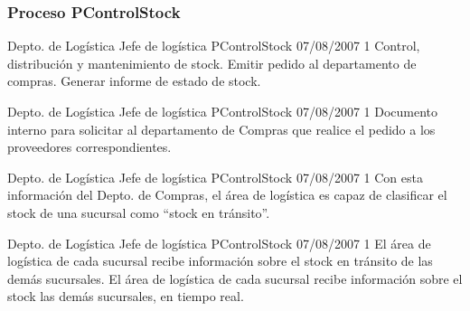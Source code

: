 \subsubsection{Proceso \textsf{PControlStock}}

\begin{apx1}
{Depto. de Logística}
{Jefe de logística}
{PControlStock}
{07/08/2007}
{1}
{Control, distribución y mantenimiento de stock.}
    {Emitir pedido al departamento de compras.}
    {Generar informe de estado de stock.}
\end{apx1}

\begin{apx2}
{Depto. de Logística}
{Jefe de logística}
{PControlStock}
{07/08/2007}
{1}
    {Documento interno para solicitar al departamento de Compras que realice el pedido a los proveedores correspondientes.}
\end{apx2}

\begin{apx3}
{Depto. de Logística}
{Jefe de logística}
{PControlStock}
{07/08/2007}
{1}
    {Con esta información del Depto. de Compras, el área de logística
     es capaz de clasificar el stock de una sucursal como ``stock en
     tránsito''.}
\end{apx3}

\begin{apx4}
{Depto. de Logística}
{Jefe de logística}
{PControlStock}
{07/08/2007}
{1}
    {El área de logística de cada sucursal recibe información sobre el stock
     en tránsito de las demás sucursales.}
    {El área de logística de cada sucursal recibe información sobre el stock
     las demás sucursales, en tiempo real.}
\end{apx4}


